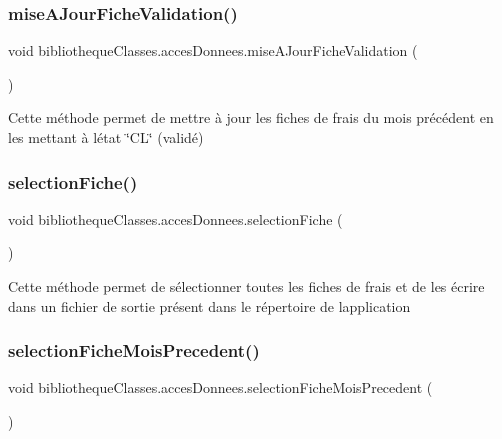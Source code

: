 \subsubsection{\texorpdfstring{mise\+A\+Jour\+Fiche\+Validation()}{miseAJourFicheValidation()}}
{\footnotesize\ttfamily void bibliotheque\+Classes.\+acces\+Donnees.\+mise\+A\+Jour\+Fiche\+Validation (\begin{DoxyParamCaption}{ }\end{DoxyParamCaption})}



Cette méthode permet de mettre à jour les fiches de frais du mois précédent en les mettant à l\textquotesingle{}état \char`\"{}\+C\+L\char`\"{} (validé) 

\mbox{\label{classbibliotheque_classes_1_1acces_donnees_a3d5707c0c32ffef3ffb96024c429962c}} 
\subsubsection{\texorpdfstring{selection\+Fiche()}{selectionFiche()}}
{\footnotesize\ttfamily void bibliotheque\+Classes.\+acces\+Donnees.\+selection\+Fiche (\begin{DoxyParamCaption}{ }\end{DoxyParamCaption})}



Cette méthode permet de sélectionner toutes les fiches de frais et de les écrire dans un fichier de sortie présent dans le répertoire de l\textquotesingle{}application 

\mbox{\label{classbibliotheque_classes_1_1acces_donnees_a28c549fe1997665d275fd37d97414990}} 
\subsubsection{\texorpdfstring{selection\+Fiche\+Mois\+Precedent()}{selectionFicheMoisPrecedent()}}
{\footnotesize\ttfamily void bibliotheque\+Classes.\+acces\+Donnees.\+selection\+Fiche\+Mois\+Precedent (\begin{DoxyParamCaption}{ }\end{DoxyParamCaption})}



